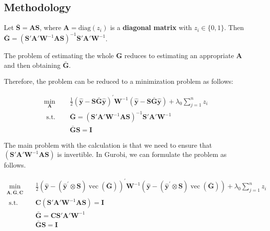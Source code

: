 \documentclass[
  letterpaper,
  DIV=11,
  numbers=noendperiod]{scrartcl}
\begin{document}
\hypertarget{methodology}{%
\subsection{Methodology}\label{methodology}}

Let \(\bar{\boldsymbol{S}} = \boldsymbol{A}\boldsymbol{S}\), where
\(\boldsymbol{A} = \text{diag}(z_i)\) is a \textbf{diagonal matrix} with
\(z_i \in \{0, 1\}\). Then
\(\bar{\boldsymbol{G}} = (\boldsymbol{S}'\boldsymbol{A}'\boldsymbol{W}^{-1}\boldsymbol{A}\boldsymbol{S})^{-1}\boldsymbol{S}'\boldsymbol{A}'\boldsymbol{W}^{-1}\).

The problem of estimating the whole \(\boldsymbol{G}\) reduces to
estimating an appropriate \(\boldsymbol{A}\) and then obtaining
\(\bar{\boldsymbol{G}}\).

Therefore, the problem can be reduced to a minimization problem as
follows:

\[
\begin{aligned}
\min _{\boldsymbol{A}} \quad & \frac{1}{2}\left(\hat{\boldsymbol{y}}-\boldsymbol{S}\bar{\boldsymbol{G}}\hat{\boldsymbol{y}}\right)^{\prime} \boldsymbol{W}^{-1}\left(\hat{\boldsymbol{y}}-\boldsymbol{S}\bar{\boldsymbol{G}}\hat{\boldsymbol{y}}\right) + \lambda_0 \sum_{j=1}^n z_i \\
\text { s.t. } \quad & \bar{\boldsymbol{G}} = (\boldsymbol{S}'\boldsymbol{A}'\boldsymbol{W}^{-1}\boldsymbol{A}\boldsymbol{S})^{-1}\boldsymbol{S}'\boldsymbol{A}'\boldsymbol{W}^{-1} \\
& \bar{\boldsymbol{G}}\boldsymbol{S} = \boldsymbol{I}
\end{aligned}
\]

The main problem with the calculation is that we need to ensure that
\((\boldsymbol{S}'\boldsymbol{A}'\boldsymbol{W}^{-1}\boldsymbol{A}\boldsymbol{S})\)
is invertible. In Gurobi, we can formulate the problem as follows.

\[
\begin{aligned}
\min _{\boldsymbol{A},\bar{\boldsymbol{G}},\boldsymbol{C}} \quad & \frac{1}{2}\left(\hat{\boldsymbol{y}}-\left(\hat{\boldsymbol{y}}^{\prime} \otimes \boldsymbol{S}\right) \operatorname{vec}(\bar{\boldsymbol{G}})\right)^{\prime} \boldsymbol{W}^{-1}\left(\hat{\boldsymbol{y}}-\left(\hat{\boldsymbol{y}}^{\prime} \otimes \boldsymbol{S}\right) \operatorname{vec}(\bar{\boldsymbol{G}})\right) + \lambda_0 \sum_{j=1}^n z_i \\
\text { s.t. } \quad & 
\boldsymbol{C}(\boldsymbol{S}'\boldsymbol{A}'\boldsymbol{W}^{-1}\boldsymbol{A}\boldsymbol{S}) = \boldsymbol{I} \\
& \bar{\boldsymbol{G}} = \boldsymbol{C}\boldsymbol{S}'\boldsymbol{A}'\boldsymbol{W}^{-1} \\
& \bar{\boldsymbol{G}}\boldsymbol{S} = \boldsymbol{I}
\end{aligned}
\]
\end{document}
